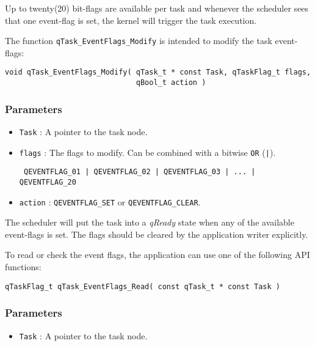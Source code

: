 Up to twenty(20) bit-flags are available per task and whenever the scheduler sees that one event-flag is set, the kernel will trigger the task execution.

The function \lstinline{qTask_EventFlags_Modify} is intended to modify the task event-flags: 
\medskip

\begin{lstlisting}[style=CStyle]
void qTask_EventFlags_Modify( qTask_t * const Task, qTaskFlag_t flags, 
                              qBool_t action )
\end{lstlisting} 

\subsubsection*{Parameters}
\begin{itemize}
    \item \lstinline{Task} : A pointer to the task node.
    \item \lstinline{flags} : The flags to modify. Can be combined with a bitwise \lstinline{OR} (\lstinline{|}).
    
    \lstinline{ QEVENTFLAG_01 | QEVENTFLAG_02 | QEVENTFLAG_03 | ... | QEVENTFLAG_20 }
    \item \lstinline{action} : \lstinline{QEVENTFLAG_SET} or \lstinline{QEVENTFLAG_CLEAR}. 
\end{itemize}

\noindent\hrulefill
\medskip

\begin{tcolorbox}
\HandRight The scheduler will put the task into a \textit{qReady} state when any of the available event-flags is set. The flags should be cleared by the application writer explicitly. 
\end{tcolorbox}

To read or check the event flags, the application can use one of the following API functions: 
\medskip

\begin{lstlisting}[style=CStyle]
qTaskFlag_t qTask_EventFlags_Read( const qTask_t * const Task )
\end{lstlisting} 

\subsubsection*{Parameters}
\begin{itemize}
    \item \lstinline{Task} : A pointer to the task node.
\end{itemize}

